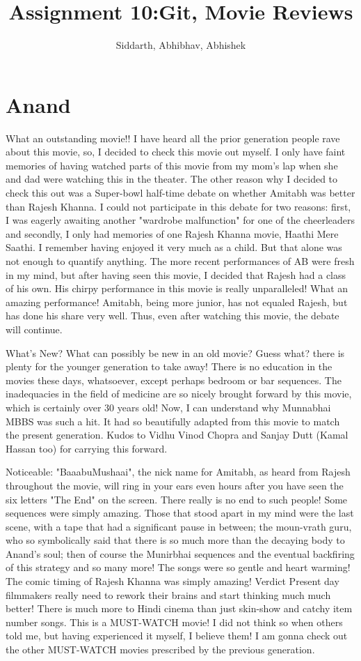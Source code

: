 \documentclass{article}
\title{Assignment 10:Git, Movie Reviews}
\author{Siddarth, Abhibhav, Abhishek}
\begin{document}
\maketitle
\section{Anand}
What an outstanding movie!! I have heard all the prior generation people rave about this movie, so, I decided to check this movie out myself. I only have faint memories of having watched parts of this movie from my mom's lap when she and dad were watching this in the theater. The other reason why I decided to check this out was a Super-bowl half-time debate on whether Amitabh was better than Rajesh Khanna. I could not participate in this debate for two reasons: first, I was eagerly awaiting another "wardrobe malfunction" for one of the cheerleaders and secondly, I only had memories of one Rajesh Khanna movie, Haathi Mere Saathi. I remember having enjoyed it very much as a child. But that alone was not enough to quantify anything. The more recent performances of AB were fresh in my mind, but after having seen this movie, I decided that Rajesh had a class of his own. His chirpy performance in this movie is really unparalleled! What an amazing performance! Amitabh, being more junior, has not equaled Rajesh, but has done his share very well. Thus, even after watching this movie, the debate will continue.

What's New? What can possibly be new in an old movie? Guess what? there is plenty for the younger generation to take away! There is no education in the movies these days, whatsoever, except perhaps bedroom or bar sequences. The inadequacies in the field of medicine are so nicely brought forward by this movie, which is certainly over 30 years old! Now, I can understand why Munnabhai MBBS was such a hit. It had so beautifully adapted from this movie to match the present generation. Kudos to Vidhu Vinod Chopra and Sanjay Dutt (Kamal Hassan too) for carrying this forward.

Noticeable: "BaaabuMushaai", the nick name for Amitabh, as heard from Rajesh throughout the movie, will ring in your ears even hours after you have seen the six letters "The End" on the screen. There really is no end to such people! Some sequences were simply amazing. Those that stood apart in my mind were the last scene, with a tape that had a significant pause in between; the moun-vrath guru, who so symbolically said that there is so much more than the decaying body to Anand's soul; then of course the Munirbhai sequences and the eventual backfiring of this strategy and so many more! The songs were so gentle and heart warming! The comic timing of Rajesh Khanna was simply amazing! Verdict Present day filmmakers really need to rework their brains and start thinking much much better! There is much more to Hindi cinema than just skin-show and catchy item number songs. This is a MUST-WATCH movie! I did not think so when others told me, but having experienced it myself, I believe them! I am gonna check out the other MUST-WATCH movies prescribed by the previous generation.
\end{document}
